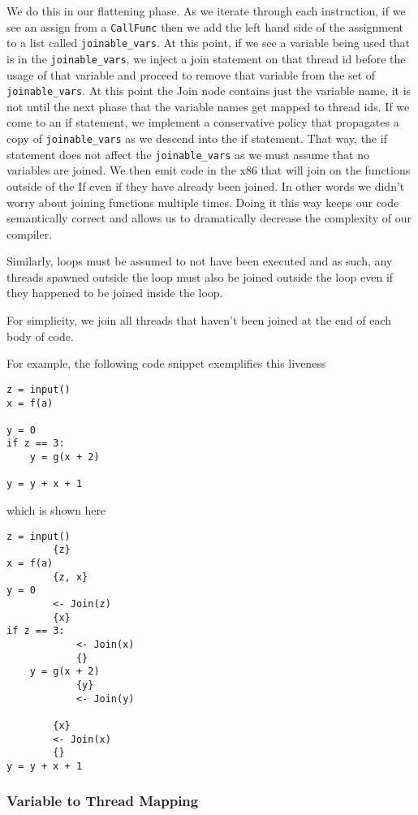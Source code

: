 \documentclass{acm_proc_article-sp}
\begin{document}
We do this in our flattening phase. As we iterate through each instruction, if
we see an assign from a \verb|CallFunc| then we add the left hand side of the
assignment to a list called \verb|joinable_vars|. At this point, if we see a
variable being used that is in the \verb|joinable_vars|, we inject a join
statement on that thread id before the usage of that variable and proceed to
remove that variable from the set of \verb|joinable_vars|. At this point the
Join node contains just the variable name, it is not until the next phase that
the variable names get mapped to thread ids.  If we come to an if statement, we
implement a conservative policy that propagates a copy of \verb|joinable_vars|
as we descend into the if statement. That way, the if statement does not affect
the \verb|joinable_vars| as we must assume that
no variables are joined.  We then emit code in the x86 that will join on the functions
outside of the If even if they have already been joined. In other words we didn't 
worry about joining functions multiple times. Doing it this way keeps our code semantically
correct and allows us to dramatically decrease the complexity of our compiler.

Similarly, loops must be assumed to not have been executed and as such,
any threads spawned outside the loop must also be joined outside the loop even
if they happened to be joined inside the loop.

For simplicity, we join all threads that haven't been joined at the end of each body of code.


For example, the following code snippet exemplifies this liveness

\begin{verbatim}
z = input()
x = f(a)

y = 0
if z == 3:
    y = g(x + 2)

y = y + x + 1
\end{verbatim}

which is shown here

\begin{verbatim}
z = input()
        {z}
x = f(a)
        {z, x}
y = 0
        <- Join(z)
        {x}
if z == 3:
            <- Join(x)
            {}
    y = g(x + 2)
            {y}
            <- Join(y)

        {x}
        <- Join(x)
        {}
y = y + x + 1
\end{verbatim}

\subsubsection*{Variable to Thread Mapping}
\end{document}
